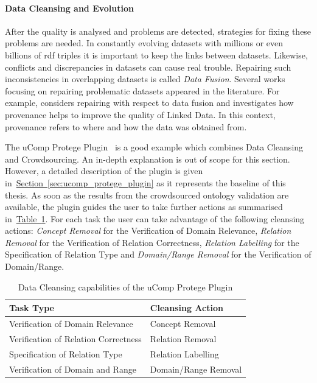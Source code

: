 \paragraph{Data Cleansing and Evolution}
After the quality is analysed and problems are detected, strategies for fixing these problems are needed. In constantly evolving datasets with millions or even billions of \gls{rdf} triples it is important to keep the links between datasets. Likewise, conflicts and discrepancies in datasets can cause real trouble. Repairing such inconsistencies in overlapping datasets is called \emph{Data Fusion}. Several works focusing on repairing problematic datasets appeared in the literature. For example, \cite{mendes2012} considers repairing with respect to data fusion and \cite{flouris2012} investigates how provenance helps to improve the quality of Linked Data. In this context, provenance refers to where and how the data was obtained from. 

The uComp Protege Plugin~\cite{wohlgenannt2016} is a good example which combines Data Cleansing and Crowdsourcing. An in-depth explanation is out of scope for this section. However, a detailed description of the plugin is given in~\hyperref[sec:ucomp_protege_plugin]{Section~\ref*{sec:ucomp_protege_plugin}} as it represents the baseline of this thesis.
As soon as the results from the crowdsourced ontology validation are available, the plugin guides the user to take further actions as summarised in~\hyperref[table:data_cleansing_ucomp_protege]{Table~\ref*{table:data_cleansing_ucomp_protege}}. For each task the user can take advantage of the following cleansing actions: \emph{Concept Removal} for the Verification of Domain Relevance, \emph{Relation Removal} for the Verification of Relation Correctness, \emph{Relation Labelling} for the Specification of Relation Type and \emph{Domain/Range Removal} for the Verification of Domain/Range. 
\begingroup
\renewcommand{\arraystretch}{2}
	\begin{table}
		\centering
		\begin{tabularx}{0.8\textwidth}{l l}
			\toprule
			Task Type & Cleansing Action \\
			\midrule
	        Verification of Domain Relevance & Concept Removal \\
			Verification of Relation Correctness & Relation Removal \\
			Specification of Relation Type & Relation Labelling \\
			Verification of Domain and Range & Domain/Range Removal \\
			\bottomrule
		\end{tabularx}
		\caption{Data Cleansing capabilities of the uComp Protege Plugin}
		\label{table:data_cleansing_ucomp_protege}
	\end{table}
\endgroup


